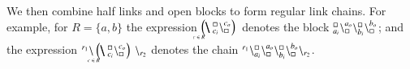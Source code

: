We then combine half links and  open blocks to form regular link chains.
%
 For example, for $R = \{a,b\}$ the expression $ \blockchain{c_i}{c_o}{c \in R} $
denotes the block ${}_{a_i}^{\scriptstyle {\square}}\backslash_{\scriptstyle {\square}}^{a_o} \backslash{}_{b_i}^{\scriptstyle {\square}}\backslash_{\scriptstyle {\square}}^{b_o}$; and the expression $\link{r_1}{} \blockchain{c_i}{c_o}{c \in R}\link{}{r_2} $ denotes the chain 
$ {}^{r_1}\backslash_{a_i}^{\scriptstyle {\square}}\backslash_{\scriptstyle {\square}}^{a_o}\backslash_{b_i}^{\scriptstyle {\square}}\backslash_{\scriptstyle {\square}}^{b_o}\backslash_{r_2}$.
